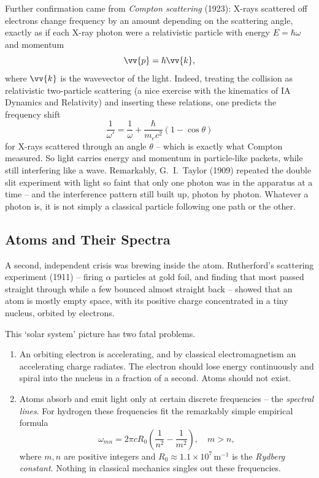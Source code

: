 Further confirmation came from \emph{Compton scattering} (1923): X-rays scattered off electrons change frequency by an amount depending on the scattering angle, exactly as if each X-ray photon were a relativistic particle with energy $E = \hbar \omega$ and momentum
$$
\vv{p} = \hbar \vv{k},
$$
where $\vv{k}$ is the wavevector of the light. Indeed, treating the collision as relativistic two-particle scattering (a nice exercise with the kinematics of IA Dynamics and Relativity) and inserting these relations, one predicts the frequency shift
$$
\frac{1}{\omega'} = \frac{1}{\omega} + \frac{\hbar}{m_e c^2}(1 - \cos \theta)
$$
for X-rays scattered through an angle $\theta$ -- which is exactly what Compton measured. So light carries energy and momentum in particle-like packets, while still interfering like a wave. Remarkably, G.\ I.\ Taylor (1909) repeated the double slit experiment with light so faint that only one photon was in the apparatus at a time -- and the interference pattern still built up, photon by photon. Whatever a photon is, it is not simply a classical particle following one path or the other.

\subsection{Atoms and Their Spectra}

A second, independent crisis was brewing inside the atom. Rutherford's scattering experiment (1911) -- firing $\alpha$ particles at gold foil, and finding that most passed straight through while a few bounced almost straight back -- showed that an atom is mostly empty space, with its positive charge concentrated in a tiny nucleus, orbited by electrons.

This `solar system' picture has two fatal problems.
\begin{enumerate}[label=(\roman*)]
    \item An orbiting electron is accelerating, and by classical electromagnetism an accelerating charge radiates. The electron should lose energy continuously and spiral into the nucleus in a fraction of a second. Atoms should not exist.
    \item Atoms absorb and emit light only at certain discrete frequencies -- the \emph{spectral lines}. For hydrogen these frequencies fit the remarkably simple empirical formula
    $$
    \omega_{mn} = 2 \pi c R_0 \left( \frac{1}{n^2} - \frac{1}{m^2} \right), \quad m > n,
    $$
    where $m, n$ are positive integers and $R_0 \approx 1.1 \times 10^7 \, \mathrm{m}^{-1}$ is the \emph{Rydberg constant}. Nothing in classical mechanics singles out these frequencies.
\end{enumerate}


